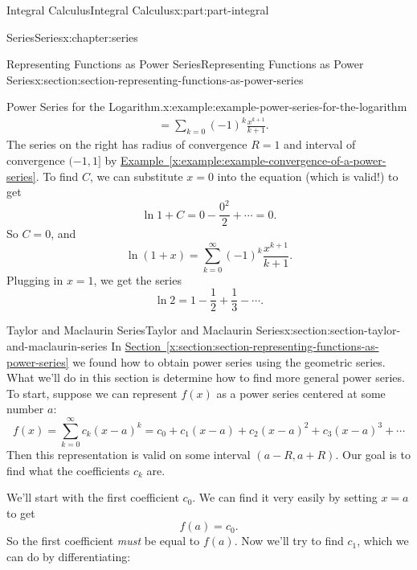\documentclass[twoside,10pt,]{tufte-book}
\newcommand{\xreffont}{\relax}
\numberwithin{equation}{part}
\newcommand{\amp}{&}
\begin{document}
\begin{partptx}{Integral Calculus}{}{Integral Calculus}{}{}{x:part:part-integral}
\begin{chapterptx}{Series}{}{Series}{}{}{x:chapter:series}
\begin{sectionptx}{Representing Functions as Power Series}{}{Representing Functions as Power Series}{}{}{x:section:section-representing-functions-as-power-series}
\begin{example}{Power Series for the Logarithm.}{x:example:example-power-series-for-the-logarithm}
\begin{align*}
\amp = \sum_{k=0} (-1)^{k} \frac{x^{k+1}}{k+1}\text{.}
\end{align*}
The series on the right has radius of convergence \(R = 1\) and interval of convergence \((-1, 1]\) by \hyperref[x:example:example-convergence-of-a-power-series]{Example~{\xreffont\ref{x:example:example-convergence-of-a-power-series}}}. To find \(C\), we can substitute \(x = 0\) into the equation (which is valid!) to get%
\begin{equation*}
\ln1 + C = 0 - \frac{0^{2}}{2} + \cdots = 0\text{.}
\end{equation*}
So \(C = 0\), and%
\begin{equation*}
\ln(1 + x) = \sum_{k=0}^{\infty}(-1)^{k}\frac{x^{k+1}}{k+1}\text{.}
\end{equation*}
Plugging in \(x = 1\), we get the series%
\begin{equation*}
\ln2 = 1 - \frac{1}{2} + \frac{1}{3} - \cdots\text{.}
\end{equation*}
%
\end{example}
\end{sectionptx}
%
%
\typeout{************************************************}
\typeout{************************************************}
%
\begin{sectionptx}{Taylor and Maclaurin Series}{}{Taylor and Maclaurin Series}{}{}{x:section:section-taylor-and-maclaurin-series}
In \hyperref[x:section:section-representing-functions-as-power-series]{Section~{\xreffont\ref{x:section:section-representing-functions-as-power-series}}} we found how to obtain power series using the geometric series. What we'll do in this section is determine how to find more general power series. To start, suppose we can represent \(f(x)\) as a power series centered at some number \(a\):%
\begin{equation*}
f(x) = \sum_{k=0}^{\infty}c_{k}(x - a)^{k} = c_{0} + c_{1}(x - a) + c_{2}(x - a)^{2} + c_{3}(x - a)^{3} + \cdots
\end{equation*}
Then this representation is valid on some interval \((a - R, a + R)\). Our goal is to find what the coefficients \(c_{k}\) are.%
\par
We'll start with the first coefficient \(c_{0}\). We can find it very easily by setting \(x = a\) to get%
\begin{equation*}
f(a) = c_{0}\text{.}
\end{equation*}
So the first coefficient \emph{must} be equal to \(f(a)\). Now we'll try to find \(c_{1}\), which we can do by differentiating:%

\end{sectionptx}
\end{chapterptx}
\end{partptx}
\end{document}
